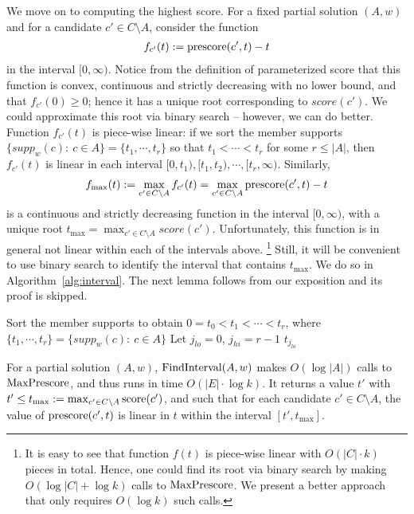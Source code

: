 We move on to computing the highest score. 
For a fixed partial solution $(A,w)$ and for a candidate $c'\in C\setminus A$, consider the function 
\begin{align}\label{eq:scorefunction}
f_{c'}(t):=\operatorname{prescore}(c',t)-t
\end{align}
$$$$ 
in the interval $[0,\infty)$. 
Notice from the definition of parameterized score that this function is convex, continuous and strictly decreasing with no lower bound, and that $f_{c'}(0)\geq 0$; hence it has a unique root corresponding to $score(c')$. We could approximate this root via binary search -- however, we can do better. 
Function $f_{c'}(t)$ is piece-wise linear: if we sort the member supports $\{supp_w(c): \ c\in A\}=\{t_1, \cdots, t_r\}$ so that $t_1 < \cdots < t_r$ for some $r\leq |A|$, then $f_{c'}(t)$ is linear in each interval $[0, t_1), [t_1, t_2), \cdots, [t_r, \infty)$.
%
Similarly, 
$$f_{\max}(t):= \max_{c'\in C\setminus A} f_{c'}(t) = \max_{c'\in C\setminus A} \operatorname{prescore}(c',t) -t$$ 
is a continuous and strictly decreasing function in the interval $[0,\infty)$, with a unique root $t_{\max}=\max_{c'\in C\setminus A} score(c')$. Unfortunately, this function is in general not linear within each of the intervals above.%
%
\footnote{It is easy to see that function $f(t)$ is piece-wise linear with $O(|C|\cdot k)$ pieces in total. Hence, one could find its root via binary search by making $O(\log |C|+ \log k)$ calls to $\operatorname{MaxPrescore}$. 
We present a better approach that only requires $O(\log k)$ such calls.} %
%
Still, it will be convenient to use binary search to identify the interval that contains $t_{\max}$. We do so in Algorithm~\ref{alg:interval}. The next lemma follows from our exposition and its proof is skipped.

\begin{algorithm}[htb]
\SetAlgoLined
{}
Sort the member supports to obtain $0=t_0<t_1<\cdots <t_r$, where $\{t_1, \cdots, t_r\}=\{supp_w(c): \ c\in A\}$\;
Let $j_{lo}=0$, $j_{hi}=r-1$\;
\Return $t_{j_{lo}}$\;

 \caption{$\interval(A,w)$}
\label{alg:interval}
\end{algorithm}

\begin{lemma}\label{lem:interval}
For a partial solution $(A,w)$, $\interval(A,w)$ makes $O(\log |A|)$ calls to $\operatorname{MaxPrescore}$, and thus runs in time $O(|E|\cdot \log k)$. It returns a value $t'$ with $t'\leq t_{\max}:=\max_{c'\in C\setminus A} \operatorname{score}(c')$, and such that for each candidate $c'\in C\setminus A$, the value of $\operatorname{prescore}(c',t)$ is linear in $t$ within the interval $[t',t_{\max}]$.
\end{lemma}


